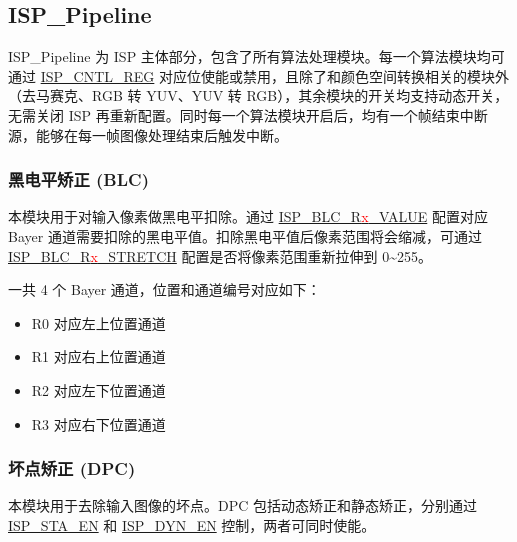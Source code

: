 \documentclass[main\_\_CN.tex]{subfiles}
\begin{document}
\subsection{ISP\_Pipeline}
\label{sec:isp_pipeline}
ISP\_Pipeline 为 ISP 主体部分，包含了所有算法处理模块。每一个算法模块均可通过 \hyperref[regdesc:ISPCNTLREG]{ISP\_CNTL\_REG} 对应位使能或禁用，且除了和颜色空间转换相关的模块外（去马赛克、RGB 转 YUV、YUV 转 RGB），其余模块的开关均支持动态开关，无需关闭 ISP 再重新配置。同时每一个算法模块开启后，均有一个帧结束中断源，能够在每一帧图像处理结束后触发中断。

\subsubsection{黑电平矫正 (BLC)}
\label{sec:isp_blc}
本模块用于对输入像素做黑电平扣除。通过 \hyperref[fielddesc:ISPBLCR0VALUE]{ISP\_BLC\_R\textcolor{red}{x}\_VALUE} 配置对应 Bayer 通道需要扣除的黑电平值。扣除黑电平值后像素范围将会缩减，可通过 \hyperref[fielddesc:ISPBLCR0STRETCH]{ISP\_BLC\_R\textcolor{red}{x}\_STRETCH} 配置是否将像素范围重新拉伸到 0\textasciitilde255。

一共 4 个 Bayer 通道，位置和通道编号对应如下：
\begin{itemize}
    \item R0 对应左上位置通道
    \item R1 对应右上位置通道
    \item R2 对应左下位置通道
    \item R3 对应右下位置通道
\end{itemize}

\subsubsection{坏点矫正 (DPC)}
\label{sec:isp_dpc}
本模块用于去除输入图像的坏点。DPC 包括动态矫正和静态矫正，分别通过 \hyperref[fielddesc:ISPSTAEN]{ISP\_STA\_EN} 和 \hyperref[fielddesc:ISPDYNEN]{ISP\_DYN\_EN} 控制，两者可同时使能。
\end{document}
